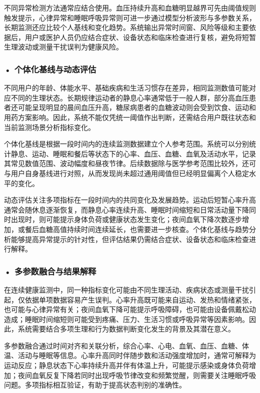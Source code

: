 不同异常检测方法通常应结合使用。血压持续升高和血糖明显越界可先由阈值规则触发提示，心律异常和睡眠呼吸异常则可进一步通过模型分析波形与多参数关系，长期监测还应比较个人基线和变化趋势。系统输出异常时间窗、风险等级和主要依据后，用户或医护人员仍应结合症状、设备状态和临床检查进行复核，避免将短暂生理波动或测量干扰误判为健康风险。


\subsubsection*{\textbf{• 个体化基线与动态评估}}

不同用户的年龄、体能水平、基础疾病和生活习惯存在差异，相同监测数值可能对应不同的生理状态。长期规律运动者的静息心率通常低于一般人群，部分高血压患者还可能呈现明显的晨间血压升高，糖尿病患者的血糖波动则会受到饮食、运动和用药方案影响。因此，系统不能仅凭统一阈值作出判断，还需结合用户既往状态和当前监测场景分析指标变化。

个体化基线是根据一段时间内的连续监测数据建立个人参考范围。系统可以分别统计静息、运动、睡眠和餐后等状态下的心率、血压、血糖、血氧及活动水平，记录其常见数值范围、波动幅度和昼夜节律。后续数据除与医学参考范围比较外，还可与用户自身基线进行对照，从而发现尚未超过通用阈值但已经明显偏离个人稳定水平的变化。

动态评估关注多项指标在一段时间内的共同变化及发展趋势。运动后短暂心率升高通常会随休息逐渐恢复，而静息心率连续升高、睡眠时间缩短和日常活动量下降同时出现时，则可能提示身体负荷或健康状态发生变化；夜间血氧下降次数逐步增加，或餐后血糖高值持续时间连续延长，也需要进一步核查。个体化基线与趋势分析能够提高异常提示的针对性，但评估结果仍需结合症状、设备状态和临床检查进行解释。


\subsubsection*{\textbf{• 多参数融合与结果解释}}

在连续健康监测中，同一种指标变化可能由不同生理活动、疾病状态或测量干扰引起，仅依据单项数据容易产生误判。心率升高既可能来自运动、发热和情绪紧张，也可能与心律异常有关；夜间血氧下降可能提示呼吸障碍，也可能由设备佩戴松动造成；睡眠时间缩短则可能受到疼痛、压力、生活习惯或呼吸异常等因素影响。因此，系统需要结合多项生理和行为数据判断变化发生的背景及其潜在意义。

多参数融合通过时间对齐和关联分析，综合心率、心电、血氧、血压、血糖、体温、活动与睡眠等信息。心率升高同时伴随步数和活动强度增加时，通常可解释为运动反应；静息状态下心率持续升高并伴有体温上升，可能提示感染或身体负荷增加；夜间血氧反复下降若同时出现呼吸节律改变和频繁觉醒，则需要关注睡眠呼吸问题。多项指标相互验证，有助于提高状态判别的准确性。

